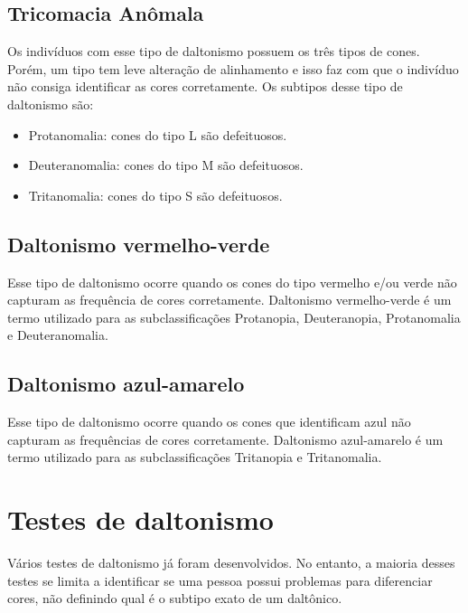 \documentclass[	12pt, Times, openright, twoside, a4paper, english, brazil]{abntex2}
\begin{document}
\subsection{Tricomacia Anômala}

Os indivíduos com esse tipo de daltonismo possuem os três tipos de cones. Porém, um tipo tem leve alteração de alinhamento e isso faz com que o indivíduo não consiga identificar as cores corretamente. Os subtipos desse tipo de daltonismo são:

\begin{itemize}
\item Protanomalia: cones do tipo L são defeituosos.
\item Deuteranomalia: cones do tipo M são defeituosos.
\item Tritanomalia: cones do tipo S são defeituosos.
\end{itemize}

\subsection{Daltonismo vermelho-verde}
Esse tipo de daltonismo ocorre quando os cones do tipo vermelho e/ou verde não capturam as frequência de cores corretamente. Daltonismo vermelho-verde é um termo utilizado para as subclassificações Protanopia, Deuteranopia, Protanomalia e Deuteranomalia.

\subsection{Daltonismo azul-amarelo}
Esse tipo de daltonismo ocorre quando os cones que identificam azul não capturam as frequências de cores corretamente. Daltonismo azul-amarelo é um termo utilizado para as subclassificações Tritanopia e Tritanomalia.

\section{Testes de daltonismo}
Vários testes de daltonismo já foram desenvolvidos. No entanto, a maioria desses testes se limita a identificar se uma pessoa possui problemas para diferenciar cores, não definindo qual é o subtipo exato de um daltônico.
\end{document}
